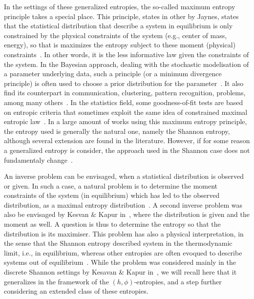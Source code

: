 \documentclass[english,sort&compress]{elsarticle}
\theoremstyle{definition}
\theoremstyle{plain}
\theoremstyle{plain}
\begin{document}
{  In the settings of these  generalized entropies, the so-called maximum entropy
  principle takes a  special place.  This principle, states  in other by Jaynes,
  states that the statistical distribution that describe a system in equilibrium
  is only constrained by the physical constraints of the system (e.g., center of
  mass,  energy), so  that  is maximizes  the  entropy subject  to these  moment
  (physical) constraints~\cite{Jay57,  Kap89, Arn01, CovTho06}.  In other words,
  it is  the less informative law given  the constraints of the  system.  In the
  Bayesian  approach, dealing with  the stochastic  modelisation of  a parameter
  underlying data, such a principle (or a minimum divergence principle) is often
  used  to choose  a prior  distribution for  the  parameter~\cite{Jay68, Csi91,
    Bas13,  FriSri08, Rob07}.  It  also find  its counterpart  in communication,
  clustering,  pattern  recognition,  problems, among  many  others~\cite{Kap89,
    JonByr90,  Arn01,  HerMa02,  ParBer09}.    In  the  statistics  field,  some
  goodness-of-fit tests  are based on  entropic criteria that  sometimes exploit
  the same  idea of constrained maximal entropic  law~\cite{Vas76, Gok83, Son02,
    Leq14,  Leq15, GirReg15}.  In  a large  amount of  works using  this maximum
  entropy principle, the  entropy used is generally the  natural one, namely the
  Shannon  entropy, although  several  extension are  found  in the  literature.
  However, if  for some reason a  generalized entropy is  consider, the approach
  used  in  the  Shannon   case  does  not  fundamentaly  change~\cite{KesKap89,
    BorLew91:03, BorLew91:05, BorLew93}.

  An  inverse problem  can  be  envisaged, when  a  statistical distribution  is
  observed  or given. In  such a  case, a  natural problem  is to  determine the
  moment  constraints  of the  system  (in equilibrium)  which  has  led to  the
  observed  distribution, as a  maximal entropy  distribution~\cite{KesKap89}. A
  second   inverse  problem   was  also   be  envisaged   by  Kesvan   \&  Kapur
  in~\cite{KesKap89}, where the distribution is  given and the moment as well. A
  question is  thus to  determine the  entropy so that  the distribution  is its
  maximiser. This problem has also  a physical interpretation, in the sense that
  the  Shannon entropy  described system  in the  thermodynamic limit,  i.e., in
  equilibrium, whereas other entropies are often evoqued to describe systems out
  of  equilibrium~\cite{Tsa88,  TsaMen98,  Tsa99,  Tsa09,  EssSch00,  ParBir05}.
  While the  problem was considered mainly  in the discrete  Shannon settings by
  Kesavan \& Kapur  in~\cite{KesKap89}, we will recall here  that it generalizes
  in the framework  of the $(h,\phi)$-entropies, and a  step further considering
  an extended class of these entropies.}
\end{document}
